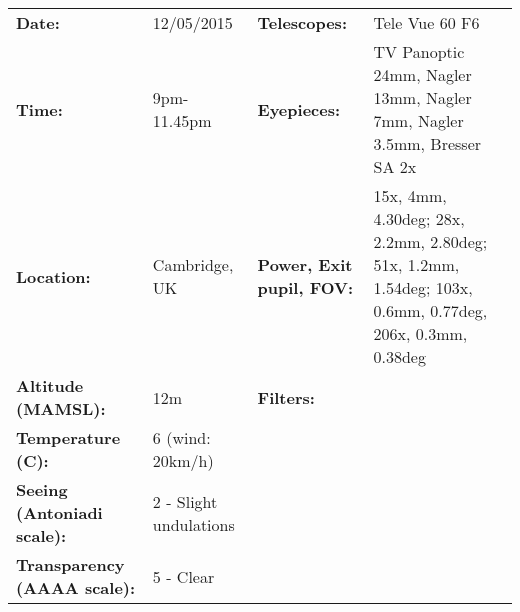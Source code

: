 \begin{tabular}{ p{1.7in} p{1.2in} p{1.5in} p{4.2in}}
{\bf Date:} & 12/05/2015 & {\bf Telescopes:} & Tele Vue 60 F6 \\ 
{\bf Time:} & 9pm-11.45pm & {\bf Eyepieces:} & TV Panoptic 24mm, Nagler 13mm, Nagler 7mm, Nagler 3.5mm, Bresser SA 2x \\ 
{\bf Location:} & Cambridge, UK & {\bf Power, Exit pupil, FOV:} & 15x, 4mm, 4.30deg; 28x, 2.2mm, 2.80deg; 51x, 1.2mm, 1.54deg; 103x, 0.6mm, 0.77deg, 206x, 0.3mm, 0.38deg \\ 
{\bf Altitude (MAMSL):} & 12m & {\bf Filters:} &  \\ 
{\bf Temperature (C):} & 6 (wind: 20km/h) & & \\ 
{\bf Seeing (Antoniadi scale):} & 2 - Slight undulations & & \\ 
{\bf Transparency (AAAA scale):} & 5 - Clear & & \\ 
\end{tabular}
\centering 
